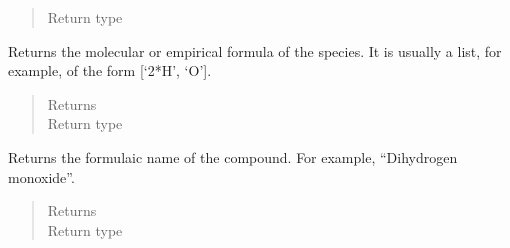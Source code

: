 \documentclass[letterpaper,10pt,openany,oneside,english]{sphinxmanual}
\begin{document}
\begin{fulllineitems}
\begin{fulllineitems}
\begin{quote}
\begin{description}
\item[{Return type}] \leavevmode
{}

\end{description}\end{quote}

\end{fulllineitems}


\begin{fulllineitems}
\label{\detokenize{support_rst/specie:specie.Specie.formula}}
Returns the molecular or empirical formula of the species. It is
usually a list, for example, of the form {[}‘2*H’, ‘O’{]}.
\begin{quote}\begin{description}
\item[{Returns}] \leavevmode
{}

\item[{Return type}] \leavevmode
{}

\end{description}\end{quote}

\end{fulllineitems}


\begin{fulllineitems}
\label{\detokenize{support_rst/specie:specie.Specie.formula_name}}
Returns the formulaic name of the compound. For example, “Dihydrogen
monoxide”.
\begin{quote}\begin{description}
\item[{Returns}] \leavevmode
{}

\item[{Return type}] \leavevmode
{}

\end{description}\end{quote}

\end{fulllineitems}



\end{fulllineitems}
\end{document}

